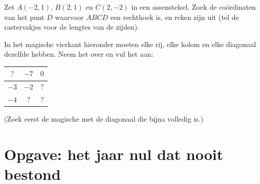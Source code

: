 \begin{exercise}[$\star\star$]\label{exo:g7:negatives:11}
Zet $A(-2, 1)$, $B(2, 1)$ en $C(2, -2)$ in een assenstelsel. Zoek de coördinaten
van het punt $D$ waarvoor $ABCD$ een rechthoek is, en reken zijn  uit (tel
de rastervakjes voor de lengtes van de zijden).
\end{exercise}

\begin{exercise}[$\star\star\star$]\label{exo:g7:negatives:12}
In het magische vierkant hieronder moeten elke rij, elke kolom en elke diagonaal
dezelfde  hebben. Neem het over en vul het aan:
\begin{center}
\renewcommand{\arraystretch}{1.4}
\begin{tabular}{|c|c|c|}
\hline
$?$ & $-7$ & $0$ \\
\hline
$-3$ & $-2$ & $?$ \\
\hline
$-4$ & $?$ & $?$ \\
\hline
\end{tabular}
\end{center}
(Zoek eerst de magische  met de diagonaal die bijna volledig is.)
\end{exercise}

\section{Opgave: het jaar nul dat nooit bestond}

